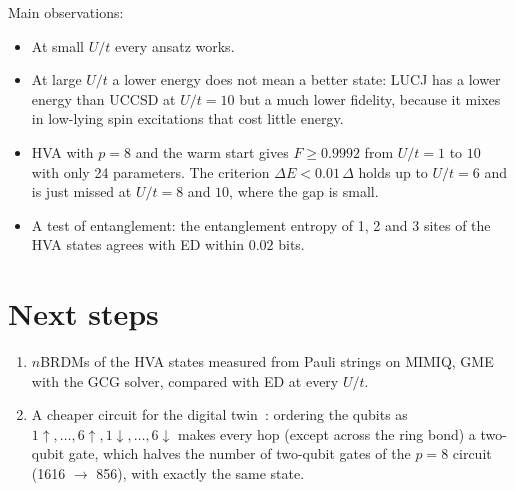 \documentclass[11pt,a4paper]{article}
\newcommand{\up}{\uparrow}
\newcommand{\dn}{\downarrow}
\begin{document}
Main observations:
\begin{itemize}
  \item At small $U/t$ every ansatz works.
  \item At large $U/t$ a lower energy does not mean a better state: LUCJ has a
    lower energy than UCCSD at $U/t = 10$ but a much lower fidelity, because it
    mixes in low-lying spin excitations that cost little energy.
  \item HVA with $p = 8$ and the warm start gives $F \ge 0.9992$ from $U/t = 1$ to
    $10$ with only 24 parameters. The criterion $\Delta E < 0.01\,\Delta$ holds
    up to $U/t = 6$ and is just missed at $U/t = 8$ and $10$, where the gap is small.
  \item A test of entanglement: the entanglement entropy of 1, 2 and 3 sites of
    the HVA states agrees with ED within $0.02$ bits.
\end{itemize}

\section{Next steps}

\begin{enumerate}
  \item $n$BRDMs of the HVA states measured from Pauli strings on MIMIQ, GME
    with the GCG solver, compared with ED at every $U/t$.
  \item A cheaper circuit for the digital twin~\cite{consiglio}: ordering the qubits as
    $1\up,\dots,6\up,1\dn,\dots,6\dn$ makes every hop (except across the ring
    bond) a two-qubit gate, which halves the number of two-qubit gates of the
    $p = 8$ circuit (1616 $\to$ 856), with exactly the same state.
\end{enumerate}
\end{document}
